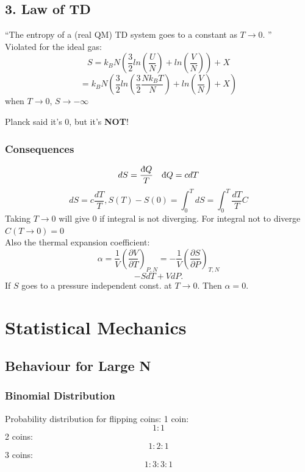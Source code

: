 \documentclass[11pt]{book}
\theoremstyle{definition}
\begin{document}
\section{3. Law of TD}
``The entropy of a (real QM) TD system goes to a constant as $ T \to 0 $. ''\\
Violated for the ideal gas:
\[ S = k_BN (\frac{3}{2}ln\left( \frac{U}{N} \right) + ln\left( \frac{V}{N} \right) ) + X \] 
\[ = k_B N\left(\frac{3}{2} ln \left(\frac{3}{2} \frac{Nk_BT}{N} \right) + ln\left( \frac{V}{N} \right) +X \right) \] 
when $ T \to 0 $, $ S \to -\infty $  

Planck said it's $ 0 $, but it's \textbf{NOT}! 
\subsection{Consequences}
\[ dS = \frac{ \text{\dj}Q }{T} \quad \text{\dj}Q = cdT\]
\[ dS = c \frac{dT}{T}, S(T)-S(0) = \int_0^{T}dS = \int_0^{T} \frac{dT}{T} C \] 
Taking $ T \to 0 $ will give $ 0 $ if integral is not diverging. For integral not to diverge $ C(T \to 0) = 0 $ \\

Also the thermal expansion coefficient:
\[ \alpha = \frac{1}{V}\left( \frac{\partial V}{\partial T} \right)_{P,N} = -\frac{1}{V} \left( \frac{\partial S}{\partial P} \right)_{T,N} \] 
\[ -SdT + V dP. \] 
If $ S $ goes to a pressure independent const. at $ T \to 0 $. Then $ \alpha=0 $.


\newpage
\chapter{Statistical Mechanics}
\section{Behaviour for Large N}
\subsection{Binomial Distribution}
Probability distribution for flipping coins:
1 coin: \[ 1:1 \] 
2 coins: \[ 1:2:1 \] 
3 coins: \[ 1:3:3:1 \] 
\end{document}
